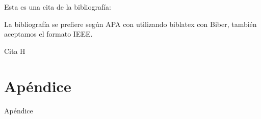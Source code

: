 \documentclass[fleqn]{Paquetes/RevDigMatEduInt}
\begin{document}
Esta es una cita de la bibliografía: \cite{H}

La bibliografía se prefiere según APA con utilizando biblatex con Biber, también aceptamos el formato IEEE.



\begin{thebibliography}{AAAAA}
	 Cita H
\end{thebibliography}

\appendix

\section{Apéndice}

Apéndice
\end{document}
